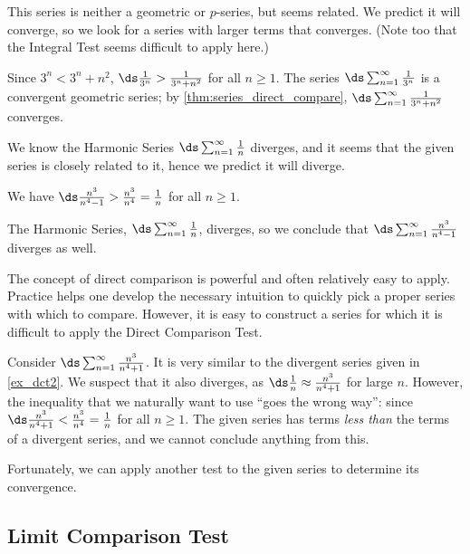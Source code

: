 
{This series is neither a geometric or $p$-series, but seems related. We predict it will converge, so we look for a series with larger terms that converges. (Note too that the Integral Test seems difficult to apply here.)

Since $3^n < 3^n+n^2$, $\ds \frac1{3^n}> \frac1{3^n+n^2}$ for all $n\geq1$. The series $\ds\sum_{n=1}^\infty \frac{1}{3^n}$ is a convergent geometric series; by \autoref{thm:series_direct_compare}, $\ds \sum_{n=1}^\infty \frac1{3^n+n^2}$ converges.}

{We know the Harmonic Series $\ds\sum_{n=1}^\infty \frac1n$ diverges, and it seems that the given series is closely related to it, hence we predict it will diverge. 

We have $\ds \frac{n^3}{n^4-1}>\frac{n^3}{n^4}=\frac{1}{n}$ for all $n\geq 1$. 

The Harmonic Series, $\ds\sum_{n=1}^\infty \frac{1}{n}$,  diverges, so we conclude that $\ds\sum_{n=1}^\infty \frac{n^3}{n^4-1}$ diverges as well.}

The concept of direct comparison is powerful and often relatively easy to apply. Practice helps one develop the necessary intuition to quickly pick a proper series with which to compare. However, it is easy to construct a series for which it is difficult to apply the Direct Comparison Test. 

Consider $\ds\sum_{n=1}^\infty \frac{n^3}{n^4+1}$. It is very similar to the divergent series given in \autoref{ex_dct2}. We suspect that it also diverges, as $\ds \frac 1n \approx \frac{n^3}{n^4+1}$ for large $n$. However, the inequality that we naturally want to use ``goes the wrong way'': since  $\ds \frac{n^3}{n^4+1}<\frac{n^3}{n^4}=\frac{1}{n}$ for all $n\geq 1$. The given series has terms \textit{less than} the terms of a divergent series, and we cannot conclude anything from this.

Fortunately, we can apply another test to the given series to determine its convergence.

\subsection*{Limit Comparison Test}

